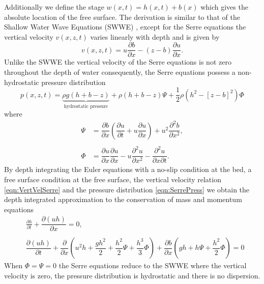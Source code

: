 Additionally we define the stage $w(x,t) = h(x,t) + b(x)$ which gives the absolute location of the free surface. The derivation is similar to that of the Shallow Water Wave Equations (SWWE) \cite{Liggett-1994}, except for the Serre equations the vertical velocity $v(x,z,t)$ varies linearly with depth and is given by \cite{Zoppou-2014}
\begin{equation}
v(x,z,t) = u \frac{\partial b}{\partial x} - (z - b) \frac{\partial u}{\partial x}.
\label{eqn:VertVelSerre}
\end{equation}
Unlike the SWWE the vertical velocity of the Serre equations is not zero throughout the depth of water consequently, the Serre equations possess a non-hydrostatic pressure distribution
\begin{equation}
\label{eqn:SerrePress}
 p(x,z,t) = \underbrace{ \rho g \left(h + b - z\right)}_{\text{hydrostatic pressure}} + \rho \left(h + b - z\right) \Psi + \frac{1}{2} \rho \left(h^2 - \left[z - b \right]^2\right) {\Phi }
\end{equation} 
where
\begin{subequations}
	\begin{align}
	{ \Psi }  &= \dfrac{\partial b}{\partial x}\left(\dfrac{\partial u}{\partial t} + u\dfrac{\partial u}{\partial x} \right)  + u^2\dfrac{\partial^2 b}{\partial x^2}, \label{eqn:SerreeqnPsi} \\ \nonumber \\
	{ \Phi }  &= \dfrac{\partial u }{\partial x} \dfrac{\partial u}{\partial x} -u \dfrac{\partial^2 u}{\partial x^2}  - \dfrac{\partial^2 u}{\partial x \partial t} . \label{eqn:SerreeqnPhi} 
	\end{align}
	\label{eqn:FullSerreNonConVarDef}
\end{subequations}
By depth integrating the Euler equations \cite{Su-Gardener-1969-536,Zoppou-2014} with a no-slip condition at the bed, a free surface condition at the free surface, the vertical velocity relation \eqref{eqn:VertVelSerre} and the pressure distribution \eqref{eqn:SerrePress} we obtain the depth integrated approximation to the conservation of mass and momentum equations
\begin{subequations}
	\begin{align}
	&\frac{\partial h}{\partial t} + \dfrac{\partial (uh)}{\partial x} = 0,  \label{eqn:FullSerreNonConMass} \\ \nonumber \\
	&\dfrac{\partial (uh)}{\partial t} + \dfrac{\partial}{\partial x} \left ( u^2h + \dfrac{gh^2}{2} + \dfrac{h^2}{2}{\Psi} + \dfrac{h^3}{3}{ \Phi }  \right )  +  \dfrac{\partial b}{\partial x} \left (gh +   h \Psi + \dfrac{h^2}{2}{ \Phi }  \right ) = 0	\label{eqn:FullSerreNonConMome}
	\end{align}
	\label{eqn:FullSerreNonCon}
\end{subequations}
When $\Phi = \Psi = 0$ the Serre equations reduce to the SWWE where the vertical velocity is zero, the pressure distribution is hydrostatic and there is no dispersion. 

